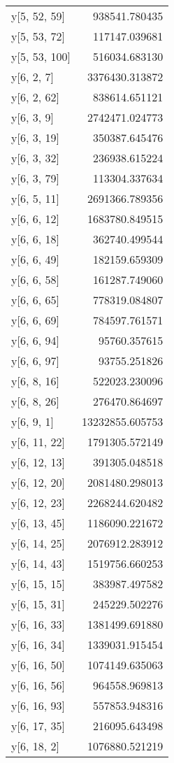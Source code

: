 \begin{longtable}{lr}
y[5, 52, 59] & 938541.780435 \\
y[5, 53, 72] & 117147.039681 \\
y[5, 53, 100] & 516034.683130 \\
y[6, 2, 7] & 3376430.313872 \\
y[6, 2, 62] & 838614.651121 \\
y[6, 3, 9] & 2742471.024773 \\
y[6, 3, 19] & 350387.645476 \\
y[6, 3, 32] & 236938.615224 \\
y[6, 3, 79] & 113304.337634 \\
y[6, 5, 11] & 2691366.789356 \\
y[6, 6, 12] & 1683780.849515 \\
y[6, 6, 18] & 362740.499544 \\
y[6, 6, 49] & 182159.659309 \\
y[6, 6, 58] & 161287.749060 \\
y[6, 6, 65] & 778319.084807 \\
y[6, 6, 69] & 784597.761571 \\
y[6, 6, 94] & 95760.357615 \\
y[6, 6, 97] & 93755.251826 \\
y[6, 8, 16] & 522023.230096 \\
y[6, 8, 26] & 276470.864697 \\
y[6, 9, 1] & 13232855.605753 \\
y[6, 11, 22] & 1791305.572149 \\
y[6, 12, 13] & 391305.048518 \\
y[6, 12, 20] & 2081480.298013 \\
y[6, 12, 23] & 2268244.620482 \\
y[6, 13, 45] & 1186090.221672 \\
y[6, 14, 25] & 2076912.283912 \\
y[6, 14, 43] & 1519756.660253 \\
y[6, 15, 15] & 383987.497582 \\
y[6, 15, 31] & 245229.502276 \\
y[6, 16, 33] & 1381499.691880 \\
y[6, 16, 34] & 1339031.915454 \\
y[6, 16, 50] & 1074149.635063 \\
y[6, 16, 56] & 964558.969813 \\
y[6, 16, 93] & 557853.948316 \\
y[6, 17, 35] & 216095.643498 \\
y[6, 18, 2] & 1076880.521219 \\

\end{longtable}
